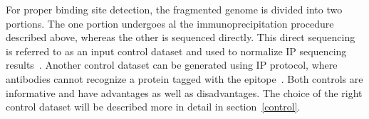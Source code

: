 For proper binding site detection, the fragmented genome is divided into two portions. 
The one portion undergoes al the immunoprecipitation procedure described above, whereas the other is sequenced directly. 
This direct sequencing is referred to as an input control dataset and used to normalize IP sequencing results~\cite{kidder2011chip}. 
Another control dataset can be generated using IP protocol, where antibodies cannot recognize a protein tagged with the epitope~\cite{flensburg2014comparison}. 
Both controls are informative and have advantages as well as disadvantages.
The choice of the right control dataset will be described more in detail in section~\ref{control}.
